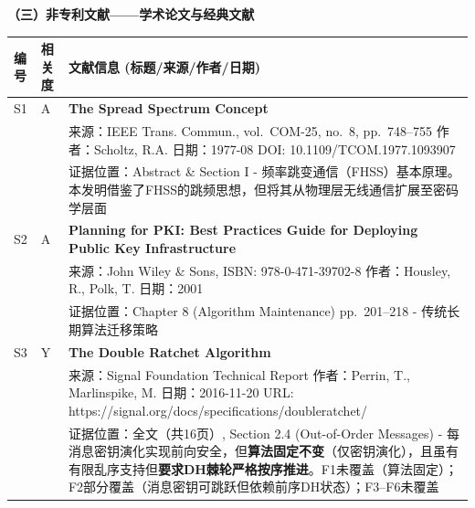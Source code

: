 ﻿\documentclass[12pt,a4paper]{article}
\begin{document}
\clearpage
\textbf{（三）非专利文献——学术论文与经典文献}

\begingroup
{}
\small
\renewcommand{\arraystretch}{1.2}
\begin{tabular}{|p{1.2cm}|p{1.8cm}|p{11.0cm}|}
\hline
\textbf{编号} & \textbf{相关度} & \textbf{文献信息 (标题/来源/作者/日期)} \\
\hline

S1 & A & \textbf{The Spread Spectrum Concept} \\
& & 来源：IEEE Trans. Commun., vol.~COM-25, no.~8, pp.~748--755 \quad 作者：Scholtz, R.A. \quad 日期：1977-08 \quad DOI: 10.1109/TCOM.1977.1093907 \\
& & 证据位置：Abstract \& Section I - 频率跳变通信（FHSS）基本原理。本发明借鉴了FHSS的跳频思想，但将其从物理层无线通信扩展至密码学层面 \\
\hline
S2 & A & \textbf{Planning for PKI: Best Practices Guide for Deploying Public Key Infrastructure} \\
& & 来源：John Wiley \& Sons, ISBN: 978-0-471-39702-8 \quad 作者：Housley, R., Polk, T. \quad 日期：2001 \\
& & 证据位置：Chapter 8 (Algorithm Maintenance) pp.~201--218 - 传统长期算法迁移策略 \\
\hline
S3 & Y & \textbf{The Double Ratchet Algorithm} \\
& & 来源：Signal Foundation Technical Report \quad 作者：Perrin, T., Marlinspike, M. \quad 日期：2016-11-20 \quad URL: https://signal.org/docs/specifications/doubleratchet/ \\
& & 证据位置：全文（共16页）, Section 2.4 (Out-of-Order Messages) - 每消息密钥演化实现前向安全，但\textbf{算法固定不变}（仅密钥演化），且虽有有限乱序支持但\textbf{要求DH棘轮严格按序推进}。F1未覆盖（算法固定）；F2部分覆盖（消息密钥可跳跃但依赖前序DH状态）；F3--F6未覆盖 \\
\hline
\end{tabular}
\end{document}
